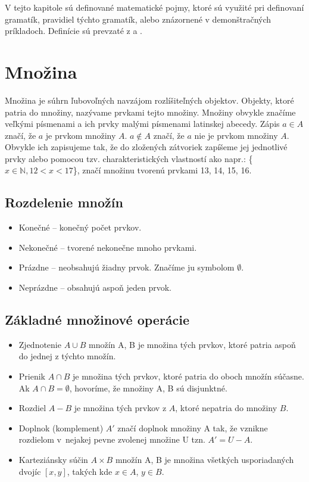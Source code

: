 V tejto kapitole sú definované matematické pojmy, ktoré sú využité pri definovaní gramatík, pravidiel týchto gramatík, alebo znázornené v demonštračných príkladoch. Definície sú prevzaté z \cite{Automata} a \cite{Mnoziny}. 

\section{Množina}

Množina je súhrn ľubovoľných navzájom rozlíšiteľných objektov. Objekty, ktoré patria do množiny, nazývame prvkami tejto množiny. Množiny obvykle značíme veľkými písmenami a ich prvky malými písmenami latinskej abecedy. Zápis $a \in A$ značí, že $a$ je prvkom množiny $A$. $a \notin A$ značí, že $a$ nie je prvkom množiny $A$. Obvykle ich zapisujeme tak, že do zložených zátvoriek zapíšeme jej jednotlivé prvky alebo pomocou tzv. charakteristických vlastností ako napr.: \{ $x \in \mathbb{N}, 12 < x < 17 $\}, značí množinu tvorenú prvkami 13, 14, 15, 16.

\subsection{Rozdelenie množín} 

\begin{itemize}
\item Konečné -- konečný počet prvkov.
\item Nekonečné -- tvorené nekonečne mnoho prvkami.
\item Prázdne -- neobsahujú žiadny prvok. Značíme ju symbolom $\emptyset$.
\item Neprázdne -- obsahujú aspoň jeden prvok.
\end{itemize}

\subsection{Základné množinové operácie}

\begin{itemize}
\item Zjednotenie $A \cup B$ množín A, B je množina tých prvkov, ktoré patria aspoň do jednej z týchto množín.
\item Prienik $A \cap B$ je množina tých prvkov, ktoré patria do oboch množín súčasne. Ak $A \cap B = \emptyset$, hovoríme, že množiny A, B sú disjunktné.
\item Rozdiel $A - B$ je množina tých prvkov z $A$, ktoré nepatria do množiny $B$. 
\item Doplnok (komplement) $A'$ značí doplnok množiny A tak, že vznikne rozdielom v~nejakej pevne zvolenej množine U tzn. $A' = U - A$.
\item Karteziánsky súčin $A \times B$ množín A, B je množina všetkých usporiadaných dvojíc $[x,y]$, takých kde $x \in A$, $y \in B$.
\end{itemize}


